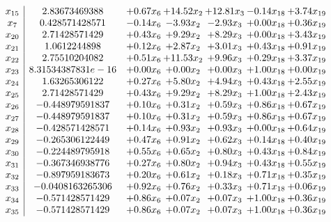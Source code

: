 \documentclass[8pt]{article}
\begin{document}
\[\begin{array}{c| c c@{\hskip 2pt} c@{\hskip 2pt} c@{\hskip 2pt} c@{\hskip 2pt} c@{\hskip 2pt} }
 x_{15}   &  2.83673469388 & +  0.67 x_{6} & + 14.52 x_{2} & + 12.81 x_{3} & -0.14 x_{18} & +  3.74 x_{19}\\
 x_{7}   &  0.428571428571 & -0.14 x_{6} & -3.93 x_{2} & -2.93 x_{3} & +  0.00 x_{18} & +  0.36 x_{19}\\
 x_{20}   &  2.71428571429 & +  0.43 x_{6} & +  9.29 x_{2} & +  8.29 x_{3} & +  0.00 x_{18} & +  3.43 x_{19}\\
 x_{21}   &  1.0612244898 & +  0.12 x_{6} & +  2.87 x_{2} & +  3.01 x_{3} & +  0.43 x_{18} & +  0.91 x_{19}\\
 x_{22}   &  2.75510204082 & +  0.51 x_{6} & + 11.53 x_{2} & +  9.96 x_{3} & +  0.29 x_{18} & +  3.37 x_{19}\\
 x_{23}   &  8.31534387831e-16 & +  0.00 x_{6} & +  0.00 x_{2} & +  0.00 x_{3} & +  1.00 x_{18} & +  0.00 x_{19}\\
 x_{24}   &  1.63265306122 & +  0.27 x_{6} & +  5.80 x_{2} & +  4.94 x_{3} & +  0.43 x_{18} & +  2.55 x_{19}\\
 x_{25}   &  2.71428571429 & +  0.43 x_{6} & +  9.29 x_{2} & +  8.29 x_{3} & +  1.00 x_{18} & +  2.43 x_{19}\\
 x_{26}   &  -0.448979591837 & +  0.10 x_{6} & +  0.31 x_{2} & +  0.59 x_{3} & +  0.86 x_{18} & +  0.67 x_{19}\\
 x_{27}   &  -0.448979591837 & +  0.10 x_{6} & +  0.31 x_{2} & +  0.59 x_{3} & +  0.86 x_{18} & +  0.67 x_{19}\\
 x_{28}   &  -0.428571428571 & +  0.14 x_{6} & +  0.93 x_{2} & +  0.93 x_{3} & +  0.00 x_{18} & +  0.64 x_{19}\\
 x_{29}   &  -0.265306122449 & +  0.47 x_{6} & +  0.91 x_{2} & +  0.62 x_{3} & +  0.14 x_{18} & +  0.40 x_{19}\\
 x_{30}   &  -0.224489795918 & +  0.55 x_{6} & +  0.65 x_{2} & +  0.80 x_{3} & +  0.43 x_{18} & +  0.84 x_{19}\\
 x_{31}   &  -0.367346938776 & +  0.27 x_{6} & +  0.80 x_{2} & +  0.94 x_{3} & +  0.43 x_{18} & +  0.55 x_{19}\\
 x_{32}   &  -0.897959183673 & +  0.20 x_{6} & +  0.61 x_{2} & +  0.18 x_{3} & +  0.71 x_{18} & +  0.35 x_{19}\\
 x_{33}   &  -0.0408163265306 & +  0.92 x_{6} & +  0.76 x_{2} & +  0.33 x_{3} & +  0.71 x_{18} & +  0.06 x_{19}\\
 x_{34}   &  -0.571428571429 & +  0.86 x_{6} & +  0.07 x_{2} & +  0.07 x_{3} & +  1.00 x_{18} & +  0.36 x_{19}\\
 x_{35}   &  -0.571428571429 & +  0.86 x_{6} & +  0.07 x_{2} & +  0.07 x_{3} & +  1.00 x_{18} & +  0.36 x_{19}\\

\end{array}\]
\end{document}
